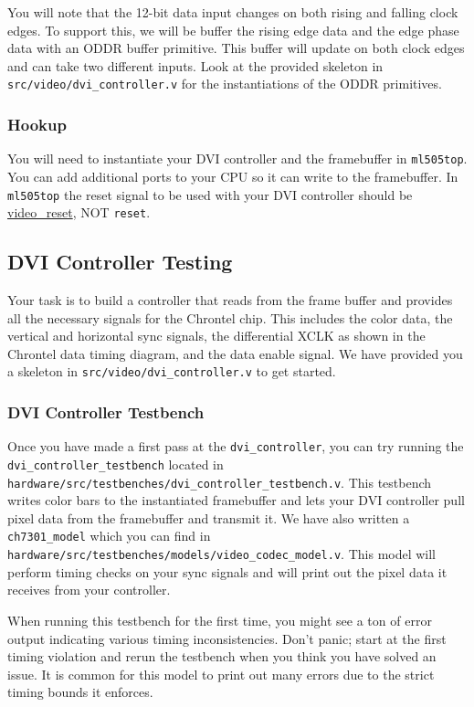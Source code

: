 \documentclass[11pt]{article}
\begin{document}
You will note that the 12-bit data input changes on both rising and falling clock edges. To support this, we will be buffer the rising edge data and the edge phase data with an ODDR buffer primitive. This buffer will update on both clock edges and can take two different inputs. Look at the provided skeleton in \verb|src/video/dvi_controller.v| for the instantiations of the ODDR primitives.

\subsubsection{Hookup}

You will need to instantiate your DVI controller and the framebuffer in \verb|ml505top|. You can add additional ports to your CPU so it can write to the framebuffer. In \verb|ml505top| the reset signal to be used with your DVI controller should be \underline{video\_reset}, NOT \verb|reset|.

\subsection{DVI Controller Testing}

Your task is to build a controller that reads from the frame buffer and provides all the necessary signals for the Chrontel chip. This includes the color data, the vertical and horizontal sync signals, the differential XCLK as shown in the Chrontel data timing diagram, and the data enable signal. We have provided you a skeleton in \verb|src/video/dvi_controller.v| to get started.

\subsubsection{DVI Controller Testbench}
Once you have made a first pass at the \verb|dvi_controller|, you can try running the \verb|dvi_controller_testbench| located in \verb|hardware/src/testbenches/dvi_controller_testbench.v|. This testbench writes color bars to the instantiated framebuffer and lets your DVI controller pull pixel data from the framebuffer and transmit it. We have also written a \verb|ch7301_model| which you can find in\\ \verb|hardware/src/testbenches/models/video_codec_model.v|. This model will perform timing checks on your sync signals and will print out the pixel data it receives from your controller.

When running this testbench for the first time, you might see a ton of error output indicating various timing inconsistencies. Don't panic; start at the first timing violation and rerun the testbench when you think you have solved an issue. It is common for this model to print out many errors due to the strict timing bounds it enforces.
\end{document}
